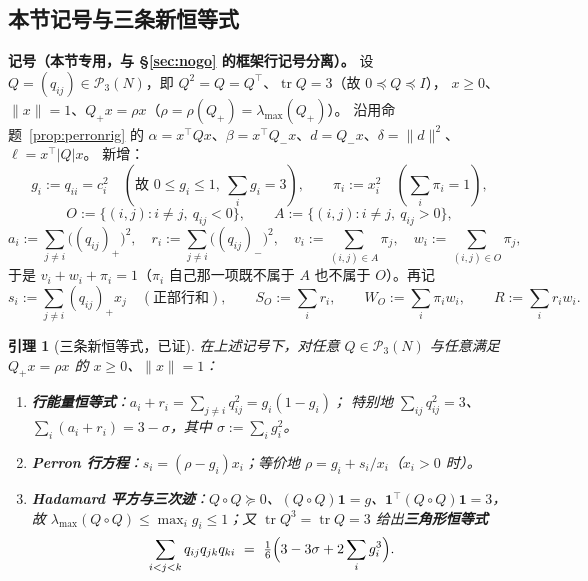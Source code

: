 \documentclass[UTF8,11pt]{ctexart}
\newtheorem{lemma}[theorem]{引理}
\theoremstyle{definition}
\newcommand{\tr}{\operatorname{tr}}
\newcommand{\one}{\mathbf{1}}
\begin{document}
\subsection{本节记号与三条新恒等式}\label{sec:rowid}

\textbf{记号（本节专用，与 \S\ref{sec:nogo} 的框架行记号分离）。}
设 $Q=(q_{ij})\in\mathcal P_3(N)$，即 $Q^2=Q=Q^\top$、$\tr Q=3$（故 $0\preceq Q\preceq I$），
$x\ge0$、$\|x\|=1$、$Q_+x=\rho x$（$\rho=\rho(Q_+)=\lambda_{\max}(Q_+)$）。
沿用命题~\ref{prop:perronrig} 的 $\alpha=x^\top Qx$、$\beta=x^\top Q_-x$、$d=Q_-x$、$\delta=\|d\|^2$、$\ell=x^\top|Q|x$。
新增：
\[
g_i:=q_{ii}=c_i^2\quad(\text{故 }0\le g_i\le1,\ \textstyle\sum_ig_i=3),\qquad
\pi_i:=x_i^2\quad(\textstyle\sum_i\pi_i=1),
\]
\[
O:=\{(i,j):i\ne j,\ q_{ij}<0\},\qquad A:=\{(i,j):i\ne j,\ q_{ij}>0\},
\]
\[
a_i:=\!\!\sum_{j\ne i}\!\bigl((q_{ij})_+\bigr)^2,\quad
r_i:=\!\!\sum_{j\ne i}\!\bigl((q_{ij})_-\bigr)^2,\quad
v_i:=\!\!\sum_{(i,j)\in A}\!\!\pi_j,\quad
w_i:=\!\!\sum_{(i,j)\in O}\!\!\pi_j,
\]
于是 $v_i+w_i+\pi_i=1$（$\pi_i$ 自己那一项既不属于 $A$ 也不属于 $O$）。再记
\[
s_i:=\sum_{j\ne i}(q_{ij})_+x_j\quad(\text{正部行和}),\qquad
S_O:=\sum_ir_i,\qquad W_O:=\sum_i\pi_iw_i,\qquad R:=\sum_ir_iw_i .
\]

\begin{lemma}[三条新恒等式，已证]\label{lem:rowid}
在上述记号下，对\emph{任意} $Q\in\mathcal P_3(N)$ 与\emph{任意}满足 $Q_+x=\rho x$ 的 $x\ge0$、$\|x\|=1$：
\begin{enumerate}[label=(\roman*),leftmargin=2.2em]
\item \textbf{行能量恒等式}：$\displaystyle a_i+r_i=\sum_{j\ne i}q_{ij}^2=g_i(1-g_i)$；
特别地 $\sum_{ij}q_{ij}^2=3$、$\sum_i(a_i+r_i)=3-\sigma$，其中 $\sigma:=\sum_ig_i^2$。
\item \textbf{Perron 行方程}：$s_i=(\rho-g_i)x_i$；等价地 $\rho=g_i+s_i/x_i$（$x_i>0$ 时）。
\item \textbf{Hadamard 平方与三次迹}：$Q\circ Q\succeq0$、$(Q\circ Q)\one=g$、$\one^\top(Q\circ Q)\one=3$，
故 $\lambda_{\max}(Q\circ Q)\le\max_ig_i\le1$；又 $\tr Q^3=\tr Q=3$ 给出\textbf{三角形恒等式}
\begin{equation}\label{eq:tri}
\sum_{i<j<k}q_{ij}q_{jk}q_{ki}\ =\ \tfrac16\Bigl(3-3\sigma+2\sum_ig_i^3\Bigr).
\end{equation}
\end{enumerate}
\end{lemma}
\end{document}
